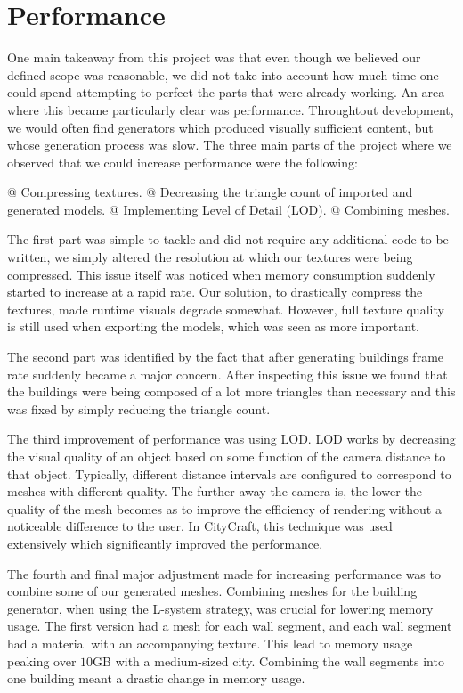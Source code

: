 \section{Performance}

One main takeaway from this project was that even though we believed our defined scope was reasonable, we did not take into account how much time one could spend attempting to perfect the parts that were already working.
An area where this became particularly clear was performance.
Throughtout development, we would often find generators which produced visually sufficient content, but whose generation process was slow. 
The three main parts of the project where we observed that we could increase performance were the following:

\begin{easylist}
  @ Compressing textures.
  @ Decreasing the triangle count of imported and generated models.
  @ Implementing Level of Detail (LOD).
  @ Combining meshes. 
\end{easylist}
 
The first part was simple to tackle and did not require any additional code to be written, we simply altered the resolution at which our textures were being compressed.
This issue itself was noticed when memory consumption suddenly started to increase at a rapid rate.
Our solution, to drastically compress the textures, made runtime visuals degrade somewhat.
However, full texture quality is still used when exporting the models, which was seen as more important.

The second part was identified by the fact that after generating buildings frame rate suddenly became a major concern. 
After inspecting this issue we found that the buildings were being composed of a lot more triangles than necessary and this was fixed by simply reducing the triangle count. 

The third improvement of performance was using LOD.
LOD works by decreasing the visual quality of an object based on some function of the camera distance to that object.
Typically, different distance intervals are configured to correspond to meshes with different quality.
The further away the camera is, the lower the quality of the mesh becomes as to improve the efficiency of rendering without a noticeable difference to the user.
In CityCraft, this technique was used extensively which significantly improved the performance.

The fourth and final major adjustment made for increasing performance was to combine some of our generated meshes. 
Combining meshes for the building generator, when using the L-system strategy, was crucial for lowering memory usage. 
The first version had a mesh for each wall segment, and each wall segment had a material with an accompanying texture. 
This lead to memory usage peaking over $10$GB with a medium-sized city. 
Combining the wall segments into one building meant a drastic change in memory usage. 

